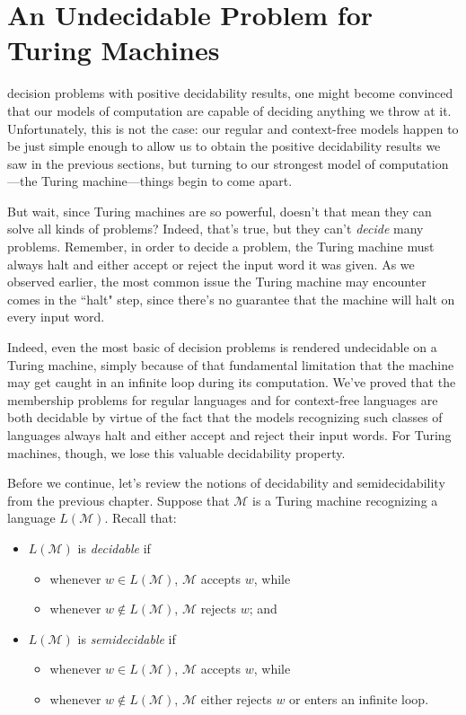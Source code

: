 \section{An Undecidable Problem for Turing Machines}\label{sec:undecidableTM}

 decision problems with positive decidability results, one might become convinced that our models of computation are capable of deciding anything we throw at it. Unfortunately, this is not the case: our regular and context-free models happen to be just simple enough to allow us to obtain the positive decidability results we saw in the previous sections, but turning to our strongest model of computation---the Turing machine---things begin to come apart.

But wait, since Turing machines are so powerful, doesn't that mean they can solve all kinds of problems? Indeed, that's true, but they can't \emph{decide} many problems. Remember, in order to decide a problem, the Turing machine must always halt and either accept or reject the input word it was given. As we observed earlier, the most common issue the Turing machine may encounter comes in the ``halt" step, since there's no guarantee that the machine will halt on every input word.

Indeed, even the most basic of decision problems is rendered undecidable on a Turing machine, simply because of that fundamental limitation that the machine may get caught in an infinite loop during its computation. We've proved that the membership problems for regular languages and for context-free languages are both decidable by virtue of the fact that the models recognizing such classes of languages always halt and either accept and reject their input words. For Turing machines, though, we lose this valuable decidability property.

Before we continue, let's review the notions of decidability and semidecidability from the previous chapter. Suppose that $\mathcal{M}$ is a Turing machine recognizing a language $L(\mathcal{M})$. Recall that:
\begin{colouredbox}
\begin{itemize}
\item $L(\mathcal{M})$ is \emph{decidable} if
	\begin{itemize}
	\item whenever $w \in L(\mathcal{M})$, $\mathcal{M}$ accepts $w$, while
	\item whenever $w \not\in L(\mathcal{M})$, $\mathcal{M}$ rejects $w$; and
	\end{itemize}
\item $L(\mathcal{M})$ is \emph{semidecidable} if
	\begin{itemize}
	\item whenever $w \in L(\mathcal{M})$, $\mathcal{M}$ accepts $w$, while
	\item whenever $w \not\in L(\mathcal{M})$, $\mathcal{M}$ either rejects $w$ or enters an infinite loop.
	\end{itemize}
\end{itemize}
\end{colouredbox}

